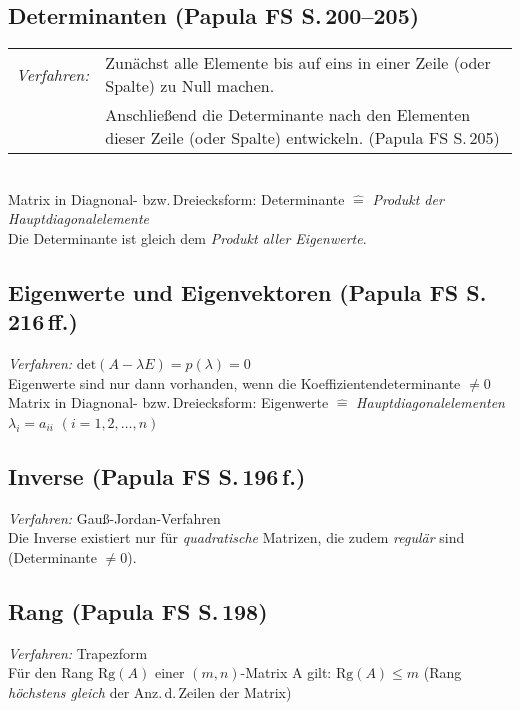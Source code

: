 \documentclass[a4paper,10pt,titlepage]{scrartcl}
\begin{document}
\subsection*{Determinanten {\fontsize{9pt}{0pt}\selectfont\normalfont (Papula FS S.\,200--205)}}
\label{sec:determinanten}
\begin{tabular}{ll}
\emph{Verfahren:} 
& Zunächst alle Elemente bis auf eins in einer Zeile (oder Spalte) zu Null machen.
\\
 
& Anschließend die Determinante nach den Elementen dieser Zeile (oder Spalte) entwickeln. (Papula FS S.\,205)
\\ 
\end{tabular}\\
Matrix in Diagnonal- bzw.\,Dreiecksform: \quad Determinante $\mathrel{\widehat{=}}$ \emph{Produkt der Hauptdiagonalelemente}\\
Die Determinante ist gleich dem \emph{Produkt aller Eigenwerte}.

\subsection*{Eigenwerte und Eigenvektoren {\fontsize{9pt}{0pt}\selectfont\normalfont (Papula FS S.\,216\,ff.)}}
\label{sec:eigenwerte_und_eigenvektoren}
\emph{Verfahren:} $\text{det} (A-\lambda E)=p(\lambda)=0$\\
Eigenwerte sind nur dann vorhanden, wenn die Koeffizientendeterminante $\neq0$\\
Matrix in Diagnonal- bzw.\,Dreiecksform: \quad Eigenwerte $\mathrel{\widehat{=}}$ \emph{Hauptdiagonalelementen} \quad $\lambda_i=a_{ii}$ $(i=1, 2, \dots, n)$

\subsection*{Inverse {\fontsize{9pt}{0pt}\selectfont\normalfont (Papula FS S.\,196\,f.)}}
\label{sec:inverse}
\emph{Verfahren:} Gauß-Jordan-Verfahren\\
Die Inverse existiert nur für  \emph{quadratische} Matrizen, die zudem \emph{regulär} sind (Determinante $\neq0$).
\bigskip\\


\subsection*{Rang {\fontsize{9pt}{0pt}\selectfont\normalfont (Papula FS S.\,198)}}
\label{sec:rang}
\emph{Verfahren:} Trapezform\\
Für den Rang $\text{Rg}(A)$ einer $(m, n)$-Matrix A gilt: \quad $\text{Rg}(A)\leq m$ \quad (Rang \emph{höchstens gleich} der Anz.\,d.\,Zeilen der Matrix)
\end{document}

